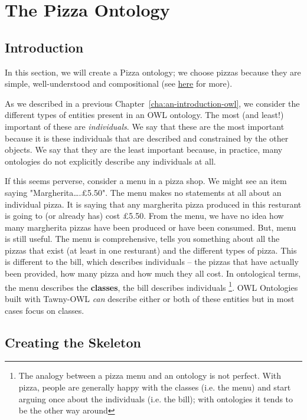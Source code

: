 
\chapter{The Pizza Ontology}
\label{cha:pizza-ontology}

\section{Introduction}
\label{sec:introduction}

In this section, we will create a Pizza ontology; we choose pizzas because
they are simple, well-understood and compositional (see
\href{http://robertdavidstevens.wordpress.com/2010/01/22/why-the-pizza-ontology-tutorial/}{here}
for more).

As we described in a previous Chapter~\ref{cha:an-introduction-owl},
we consider the different types of entities present in an OWL
ontology. The most (and least!) important of these are
\emph{individuals}. We say that these are the most important because
it is these individuals that are described and constrained by the
other objects. We say that they are the least important because, in
practice, many ontologies do not explicitly describe any individuals
at all.

If this seems perverse, consider a menu in a pizza shop. We might see
an item saying "Margherita\ldots{}.£5.50". The menu makes no
statements at all about an individual pizza. It is saying that any
margherita pizza produced in this resturant is going to (or already
has) cost £5.50. From the menu, we have no idea how many margherita
pizzas have been produced or have been consumed. But, menu is still
useful. The menu is comprehensive, tells you something about all the
pizzas that exist (at least in one resturant) and the different types
of pizza. This is different to the bill, which describes individuals
-- the pizzas that have actually been provided, how many pizza and how
much they all cost.  In ontological terms, the menu describes the
\textbf{classes}, the bill describes individuals \footnote{The analogy
  between a pizza menu and an ontology is not perfect. With pizza,
  people are generally happy with the classes (i.e. the menu) and
  start arguing once about the individuals (i.e. the bill); with
  ontologies it tends to be the other way around}. OWL Ontologies
built with Tawny-OWL \emph{can} describe either or both of these
entities but in most cases focus on classes.

\section{Creating the Skeleton}

